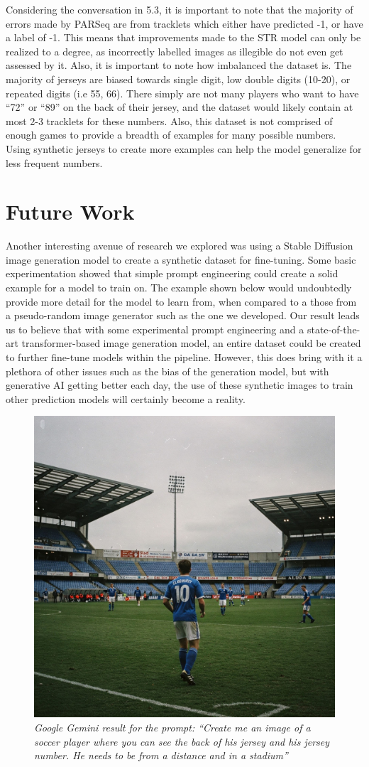 \documentclass[11pt, letterpaper]{article}
\begin{document}
Considering the conversation in 5.3, it is important to note that the majority of errors made by PARSeq are from tracklets which either have predicted -1, or have a label of -1. This means that improvements made to the STR model can only be realized to a degree, as incorrectly labelled images as illegible do not even get assessed by it. Also, it is important to note how imbalanced the dataset is. The majority of jerseys are biased towards single digit, low double digits (10-20), or repeated digits (i.e 55, 66). There simply are not many players who want to have “72” or “89” on the back of their jersey, and the dataset would likely contain at most 2-3 tracklets for these numbers. Also, this dataset is not comprised of enough games to provide a breadth of examples for many possible numbers. Using synthetic jerseys to create more examples can help the model generalize for less frequent numbers.

\section{Future Work}

Another interesting avenue of research we explored was using a Stable Diffusion image generation model to create a synthetic dataset for fine-tuning. Some basic experimentation showed that simple prompt engineering could create a solid example for a model to train on. The example shown below would undoubtedly provide more detail for the model to learn from, when compared to a those from a pseudo-random image generator such as the one we developed. Our result leads us to believe that with some experimental prompt engineering and a state-of-the-art transformer-based image generation model, an entire dataset could be created to further fine-tune models within the pipeline. However, this does bring with it a plethora of other issues such as the bias of the generation model, but with generative AI getting better each day, the use of these synthetic images to train other prediction models will certainly become a reality.
\begin{figure}
  \centering
  \includegraphics[width=0.5\linewidth]{img/gemini_jersey.jpg}
  \caption{\label{fig:gemini_jersey}\textit{Google Gemini result for the prompt: “Create me an image of a soccer player where you can see the back of his jersey and his jersey number. He needs to be from a distance and in a stadium”}}
\end{figure}


\clearpage


\end{document}
